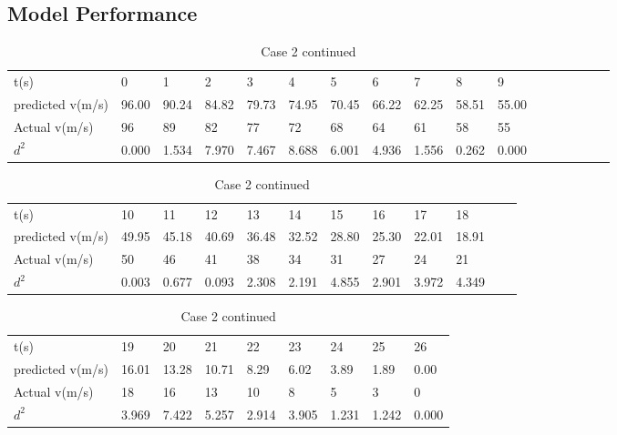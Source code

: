 \subsection{Model Performance}

\begin{table}[H]
\centering
    \begin{tabular}{|l|l|l|l|l|l|l|l|l|l|l|l|l|l|l|l|l|}
        \hline
        t(s) & 0 & 1 & 2 & 3 & 4 & 5 & 6 & 7 & 8 & 9 \\ \cline{1-11} 
        predicted v(m/s) & 96.00 & 90.24 & 84.82 & 79.73 & 74.95 & 70.45 & 66.22 & 62.25 & 58.51 & 55.00
        \\ \cline{1-11}
        Actual v(m/s) & 96 & 89 & 82 & 77 & 72 & 68 & 64 & 61 & 58 & 55 \\ \cline{1-11}
        $d^2$ & 0.000 & 1.534 & 7.970 & 7.467 & 8.688 & 6.001 & 4.936 & 1.556 & 0.262 & 0.000 \\ \cline{1-11}
    \end{tabular}
    \caption{Case 1}
    \vspace{0.5cm}

    \begin{tabular}{|l|l|l|l|l|l|l|l|l|l|l|l|}
        \hline
        t(s) & 10 & 11 & 12 & 13 & 14 & 15 & 16 & 17 & 18 \\ \cline{1-10}
        predicted v(m/s) & 49.95 & 45.18 & 40.69 & 36.48 & 32.52 & 28.80 & 25.30 & 22.01 & 18.91 \\ \cline{1-10}
        Actual v(m/s) & 50 & 46 & 41 & 38 & 34 & 31 & 27 & 24 & 21 \\ \cline{1-10}
        $d^2$ & 0.003 & 0.677 & 0.093 & 2.308 & 2.191 & 4.855 & 2.901 & 3.972 & 4.349 \\ \cline{1-10}
    \end{tabular}
    \caption{Case 2}
    \vspace{0.5cm}

    \begin{tabular}{|l|l|l|l|l|l|l|l|l|}
        \hline
        t(s) & 19 & 20 & 21 & 22 & 23 & 24 & 25 & 26 \\ \cline{1-9}
        predicted v(m/s) & 16.01 & 13.28 & 10.71 & 8.29 & 6.02 & 3.89 & 1.89 & 0.00 \\ \cline{1-9}
        Actual v(m/s) & 18 & 16 & 13 & 10 & 8 & 5 & 3 & 0
        \\ \cline{1-9}
        $d^2$ & 3.969 & 7.422 & 5.257 & 2.914 & 3.905 & 1.231 & 1.242 & 0.000 \\ \cline{1-9}
    \end{tabular}
    \caption{Case 2 continued}
\end{table}

